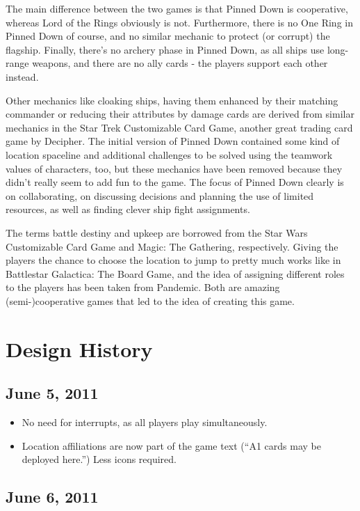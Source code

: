 \documentclass[11pt, a4paper]{article}
\begin{document}
The main difference between the two games is that Pinned Down is cooperative,
whereas Lord of the Rings obviously is not. Furthermore, there is no One Ring
in Pinned Down of course, and no similar mechanic to protect (or corrupt) the
flagship. Finally, there's no archery phase in Pinned Down, as all ships use
long-range weapons, and there are no ally cards - the players support each
other instead.

Other mechanics like cloaking ships, having them enhanced by their matching
commander or reducing their attributes by damage cards are derived from similar
mechanics in the Star Trek Customizable Card Game, another great trading card
game by Decipher. The initial version of Pinned Down contained some kind of
location spaceline and additional challenges to be solved using the teamwork
values of characters, too, but these mechanics have been removed because they
didn't really seem to add fun to the game. The focus of Pinned Down clearly is
on collaborating, on discussing decisions and planning the use of limited
resources, as well as finding clever ship fight assignments.

The terms battle destiny and upkeep are borrowed from the Star Wars Customizable
Card Game and Magic: The Gathering, respectively. Giving the players the chance
to choose the location to jump to pretty much works like in Battlestar
Galactica: The Board Game, and the idea of assigning different roles to the
players has been taken from Pandemic. Both are amazing (semi-)cooperative games
that led to the idea of creating this game.

\section{Design History}
\subsection{June 5, 2011}

\begin{itemize}
 \item No need for interrupts, as all players play simultaneously.
 \item Location affiliations are now part of the game text
(``A1 cards may be deployed here.'') Less icons required.
\end{itemize}

\subsection{June 6, 2011}
\end{document}
